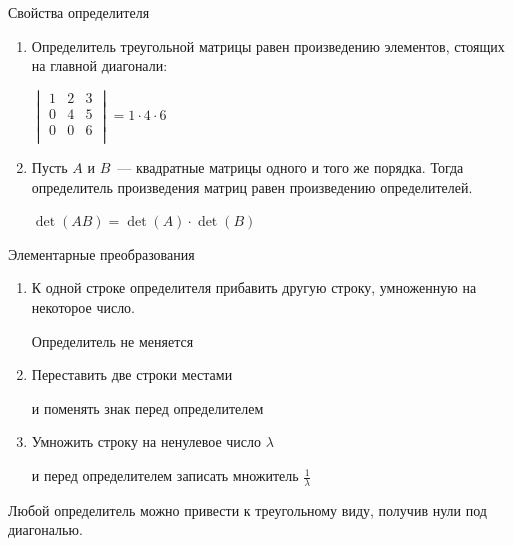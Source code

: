 \documentclass[unicode,11pt,notheorems]{beamer}
\begin{document}
\begin{frame}[allowframebreaks]{Свойства определителя}{}
\begin{enumerate}
	\item 
		Определитель треугольной матрицы  равен произведению элементов, стоящих на главной диагонали:

	    \hfill
		\alert{$
		\begin{vmatrix}
			1 & 2  & 3\\
			0 & 4  & 5\\
			0 & 0  & 6\\
		\end{vmatrix}
		= 1\cdot 4 \cdot 6
		$}

	\item 
    Пусть $A$ и $B$~--- квадратные матрицы одного и того же порядка. Тогда определитель произведения матриц равен произведению определителей.
	
	\hfill
	\alert{$
	\det(AB)=\det(A)\cdot \det(B)$}
\end{enumerate}


\end{frame}

\begin{frame}{Элементарные преобразования}
\begin{enumerate}
\item 
	К одной строке определителя прибавить другую строку, умноженную на некоторое число.
	
	\hfill\alert{Определитель не меняется}	
\item 
	Переставить две строки местами

	\hfill\alert{и поменять знак перед определителем}	
\item 
	Умножить строку на ненулевое число $\lambda$

	\hfill\alert{и перед определителем записать множитель $\frac{1}{\lambda}$}	
\end{enumerate}
\begin{block}{}
Любой определитель можно привести к треугольному виду, получив нули под диагональю. 
\end{block}
\end{frame}
\end{document}
